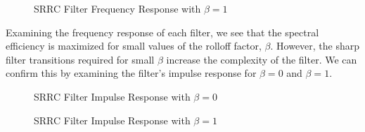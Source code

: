 \documentclass{article}
\begin{document}
\begin{figure}[H]
	\centerline{}
	\caption{SRRC Filter Frequency Response with $\beta=1$}
	\label{fig::srrc_freq_response_beta_1}
\end{figure}

\noindent Examining the frequency response of each filter, we see that the spectral efficiency is maximized for small values of the rolloff factor, $\beta$. However, the sharp filter transitions required for small $\beta$ increase the complexity of the filter. We can confirm this by examining the filter's impulse response for $\beta=0$ and $\beta=1$.

\begin{figure}[H]
	\centerline{}
	\caption{SRRC Filter Impulse Response with $\beta=0$}
	\label{fig::srrc_impulse_response_beta_0}
\end{figure}

\begin{figure}[H]
	\centerline{}
	\caption{SRRC Filter Impulse Response with $\beta=1$}
	\label{fig::srrc_impulse_response_beta_1}
\end{figure}
\end{document}
